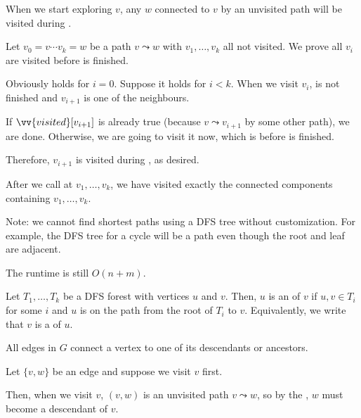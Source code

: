 \begin{lemma}\label{lem:dfs:white-path}
  When we start exploring $v$,
  any $w$ connected to $v$ by an unvisited path
  will be visited during .
\end{lemma}
\begin{prf}
  Let $v_0 = v\dotsb v_k = w$ be a path $v \leadsto w$ with $v_1,\dotsc,v_k$ all not visited.
  We prove all $v_i$ are visited before  is finished.

  Obviously holds for $i=0$.
  Suppose it holds for $i < k$.
  When we visit $v_i$,  is not finished and $v_{i+1}$
  is one of the neighbours.

  If $\vv{visited}[v_{i+1}]$ is already true (because $v \leadsto v_{i+1}$ by some other path), we are done.
  Otherwise, we are going to visit it now, which is before  is finished.

  Therefore, $v_{i+1}$ is visited during , as desired.
\end{prf}

\begin{corollary}
  After we call  at $v_1,\dotsc,v_k$,
  we have visited exactly the connected components containing $v_1,\dotsc,v_k$.
\end{corollary}

Note: we cannot find shortest paths using a DFS tree without customization.
For example, the DFS tree for a cycle will be a path even though the root and leaf are adjacent.

The runtime is still $O(n+m)$.

\begin{defn*}
  Let $T_1,\dotsc,T_k$ be a DFS forest with vertices $u$ and $v$.
  Then, $u$ is an  of $v$ if $u,v \in T_i$ for some $i$
  and $u$ is on the path from the root of $T_i$ to $v$.
  Equivalently, we write that $v$ is a  of $u$.
\end{defn*}

\begin{lemma}\label{lem:dfs:key-prop}
  All edges in $G$ connect a vertex to one of its descendants or ancestors.
\end{lemma}
\begin{prf}
  Let $\{v,w\}$ be an edge and suppose \Wlog we visit $v$ first.

  Then, when we visit $v$, $(v,w)$ is an unvisited path $v \leadsto w$,
  so by the , $w$ must become a descendant of $v$.
\end{prf}


